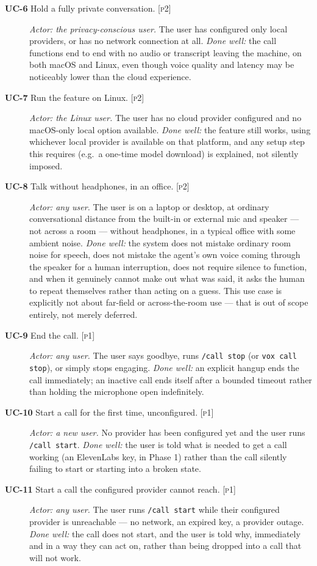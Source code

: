 \documentclass[a4paper,11pt]{report}
\newcommand{\uc}[1]{\textbf{UC-#1}}
\newcommand{\pone}{\textsc{[p1]}}
\newcommand{\ptwo}{\textsc{[p2]}}
\begin{document}
\begin{description}
\item[\uc{6} Hold a fully private conversation. \ptwo{}] \emph{Actor: the
  privacy-conscious user.} The user has configured only local providers, or
  has no network connection at all. \emph{Done well:} the call functions
  end to end with no audio or transcript leaving the machine, on both
  macOS and Linux, even though voice quality and latency may be
  noticeably lower than the cloud experience.

\item[\uc{7} Run the feature on Linux. \ptwo{}] \emph{Actor: the Linux
  user.} The user has no cloud provider configured and no macOS-only local
  option available. \emph{Done well:} the feature still works, using
  whichever local provider is available on that platform, and any setup
  step this requires (e.g.\ a one-time model download) is explained, not
  silently imposed.

\item[\uc{8} Talk without headphones, in an office. \ptwo{}] \emph{Actor:
  any user.} The user is on a laptop or desktop, at ordinary conversational
  distance from the built-in or external mic and speaker --- not across a
  room --- without headphones, in a typical office with some ambient noise.
  \emph{Done well:} the system does not mistake ordinary room noise for
  speech, does not mistake the agent's own voice coming through the
  speaker for a human interruption, does not require silence to function,
  and when it genuinely cannot make out what was said, it asks the human
  to repeat themselves rather than acting on a guess. This use case is
  explicitly not about far-field or across-the-room use --- that is out of
  scope entirely, not merely deferred.

\item[\uc{9} End the call. \pone{}] \emph{Actor: any user.} The user says
  goodbye, runs \texttt{/call stop} (or \texttt{vox call stop}), or simply
  stops engaging. \emph{Done well:} an explicit hangup ends the call
  immediately; an inactive call ends itself after a bounded timeout rather
  than holding the microphone open indefinitely.

\item[\uc{10} Start a call for the first time, unconfigured. \pone{}]
  \emph{Actor: a new user.} No provider has been configured yet and the
  user runs \texttt{/call start}. \emph{Done well:} the user is told what is
  needed to get a call working (an ElevenLabs key, in Phase 1) rather than
  the call silently failing to start or starting into a broken state.

\item[\uc{11} Start a call the configured provider cannot reach. \pone{}]
  \emph{Actor: any user.} The user runs \texttt{/call start} while their
  configured provider is unreachable --- no network, an expired key, a
  provider outage. \emph{Done well:} the call does not start, and the user
  is told why, immediately and in a way they can act on, rather than being
  dropped into a call that will not work.

\end{description}
\end{document}
